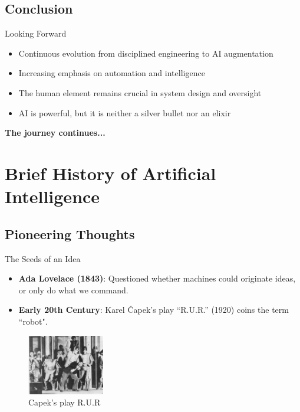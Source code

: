 \documentclass{beamer}
\begin{document}
\subsection{Conclusion}


\begin{frame}[t]{Looking Forward}
\begin{itemize}
    \item Continuous evolution from disciplined engineering to AI augmentation
    \item Increasing emphasis on automation and intelligence
    \item The human element remains crucial in system design and oversight
    \item AI is powerful, but it is neither a silver bullet nor an elixir
\end{itemize}
\begin{center}
    \textbf{The journey continues...}
\end{center}
\end{frame}
\section{Brief History of Artificial Intelligence}
\subsection{Pioneering Thoughts}
\begin{frame}[t]{The Seeds of an Idea}
    \begin{itemize}
        \item \textbf{Ada Lovelace (1843)}: Questioned whether machines could originate ideas, or only do what we command.
        \item \textbf{Early 20th Century}: Karel Čapek's play ``R.U.R.'' (1920) coins the term ``robot".
    \end{itemize}

    \begin{figure}
        \includegraphics[width=0.3\textwidth]{images/Capek_RUR.jpg}
        \caption{Capek's play R.U.R}
    \end{figure}
\end{frame}
\end{document}
